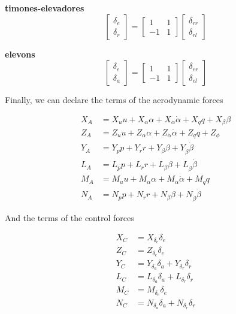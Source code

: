 \textbf{timones-elevadores}
\begin{equation}
\begin{bmatrix}
\delta_{e} \\
\delta_{r}
\end{bmatrix}
=
\begin{bmatrix}
1 & 1 \\
-1 & 1 
\end{bmatrix}
\begin{bmatrix}
\delta_{rr} \\
\delta_{rl}
\end{bmatrix}
\end{equation}

\textbf{elevons}
\begin{equation}
\begin{bmatrix}
\delta_{e} \\
\delta_{a}
\end{bmatrix}
=
\begin{bmatrix}
1 & 1 \\
-1 & 1 
\end{bmatrix}
\begin{bmatrix}
\delta_{er} \\
\delta_{el}
\end{bmatrix}
\end{equation}


Finally, we can declare the terms of the aerodynamic forces

\begin{align}
    X_A &= X_{u}u + X_{\alpha}\alpha + X_{\dot \alpha}\dot \alpha + X_{q}q + X_{\beta} \beta \\
    Z_A &= Z_{u}u + Z_{\alpha}\alpha + Z_{\dot \alpha}\dot \alpha + Z_{q}q + Z_{\phi} \\
    Y_A &= Y_{p}p + Y_{r}r + Y_{\beta}\beta + Y_{\dot \beta}\dot \beta  \\
    L_A &= L_{p}p + L_{r}r + L_{\beta}\beta + L_{\dot \beta}\dot \beta \\
    M_A &= M_{u}u + M_{\alpha}\alpha + M_{\dot \alpha}\dot \alpha + M_{q}q  \\
    N_A &= N_{p}p + N_{r}r + N_{\beta}\beta + N_{\dot \beta}\dot \beta
\end{align}

And the terms of the control forces

\begin{align}
    X_C &=  X_{\delta_{e}}\delta_{e} \\
    Z_C &=  Z_{\delta_{e}}\delta_{e} \\
    Y_C &=  Y_{\delta_{a}}\delta_{a} + Y_{\delta_{r}} \delta_{r}\\
    L_C &=  L_{\delta_{a}}\delta_{a} + L_{\delta_{r}} \delta_{r} \\
    M_C &=  M_{\delta_{e}}\delta_{e} \\
    N_C &=  N_{\delta_{a}}\delta_{a} + N_{\delta_{r}} \delta_{r}
\end{align}



